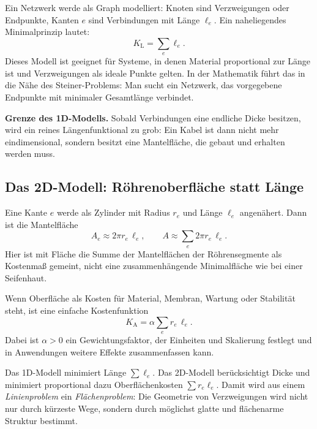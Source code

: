 Ein Netzwerk werde als Graph modelliert: Knoten sind Verzweigungen oder Endpunkte, Kanten $e$ sind Verbindungen mit Länge $\ell_e$.
Ein naheliegendes Minimalprinzip lautet:
\begin{equation}
	K_{\text{L}} = \sum_{e} \ell_e.
	\label{eq:cost_length}
\end{equation}
Dieses Modell ist geeignet für Systeme, in denen \glqq Material\grqq{} proportional zur Länge ist und Verzweigungen als ideale Punkte gelten.
In der Mathematik führt das in die Nähe des Steiner-Problems: Man sucht ein Netzwerk, das vorgegebene Endpunkte mit minimaler Gesamtlänge verbindet.

\medskip
\noindent
\textbf{Grenze des 1D-Modells.}
Sobald Verbindungen eine endliche Dicke besitzen, wird ein reines Längenfunktional zu grob:
Ein \glqq Kabel\grqq{} ist dann nicht mehr eindimensional, sondern besitzt eine Mantelfläche, die gebaut und erhalten werden muss.

\subsection{Das 2D-Modell: Röhrenoberfläche statt Länge}

Eine Kante $e$ werde als Zylinder mit Radius $r_e$ und Länge $\ell_e$ angenähert.
Dann ist die Mantelfläche
\begin{equation}
	A_e \approx 2\pi r_e\, \ell_e,
	\qquad
	A \approx \sum_e 2\pi r_e\, \ell_e.
	\label{eq:area_sum}
\end{equation}
Hier ist mit \glqq Fläche\grqq{} die Summe der Mantelflächen der Röhrensegmente als Kostenmaß gemeint,
nicht eine zusammenhängende Minimalfläche wie bei einer Seifenhaut.

Wenn Oberfläche als Kosten für Material, Membran, Wartung oder Stabilität steht, ist eine einfache Kostenfunktion
\begin{equation}
	K_{\text{A}} = \alpha \sum_e r_e\, \ell_e.
	\label{eq:cost_area}
\end{equation}
Dabei ist $\alpha>0$ ein Gewichtungsfaktor, der Einheiten und Skalierung festlegt und in Anwendungen
weitere Effekte zusammenfassen kann.
\begin{MathBox}
	\label{box:draht-rohr}

	Das 1D-Modell minimiert Länge $\sum \ell_e$.
	Das 2D-Modell berücksichtigt Dicke und minimiert proportional dazu Oberflächenkosten
	$\sum r_e\ell_e$.
	Damit wird aus einem \emph{Linienproblem} ein \emph{Flächenproblem}:
	Die Geometrie von Verzweigungen wird nicht nur durch \glqq kürzeste Wege\grqq{},
	sondern durch \glqq möglichst glatte und flächenarme Struktur\grqq{} bestimmt.
\end{MathBox}

